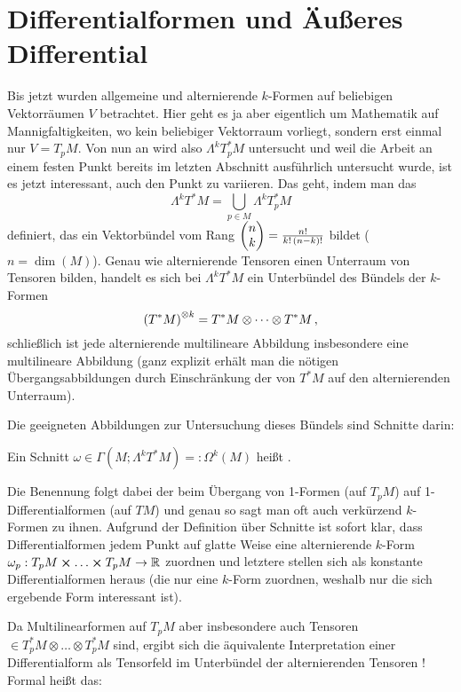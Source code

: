 \documentclass[../H_Analysis_main.tex]{subfiles}
\begin{document}
	\section{Differentialformen und Äußeres Differential}
Bis jetzt wurden allgemeine und alternierende $k$-Formen auf beliebigen Vektorräumen $V$ betrachtet. Hier geht es ja aber eigentlich um Mathematik auf Mannigfaltigkeiten, wo kein beliebiger Vektorraum vorliegt, sondern erst einmal nur $V = T_p M$. Von nun an wird also $\Lambda^k T_p^* M$ untersucht und weil die Arbeit an einem festen Punkt bereits im letzten Abschnitt ausführlich untersucht wurde, ist es jetzt interessant, auch den Punkt zu variieren. Das geht, indem man das 
\begin{equation}
\Lambda^k T^*M = \bigcup_{p \in M} \Lambda^k T_p^* M
\end{equation}
definiert, das ein Vektorbündel vom Rang $\mqty(n \\ k) = \frac{n!}{k! \, (n - k)!}$ bildet ($n = \dim(M)$). Genau wie alternierende Tensoren einen Unterraum von Tensoren bilden, handelt es sich bei $\Lambda^k T^* M$ ein Unterbündel des Bündels der $k$-Formen
\begin{equation*}
\qty(T^* M)^{\otimes k} = T^* M \otimes \dots \otimes T^* M \, ,
\end{equation*}
schließlich ist jede alternierende multilineare Abbildung insbesondere eine multilineare Abbildung (ganz explizit erhält man die nötigen Übergangsabbildungen durch Einschränkung der von $T^* M$ auf den alternierenden Unterraum).

Die geeigneten Abbildungen zur Untersuchung dieses Bündels sind Schnitte darin:
\begin{defi}[Differentialform]
Ein Schnitt $\omega \in \Gamma(M; \Lambda^k T^*M) =: \Omega^k(M)$ heißt .
\end{defi}

Die Benennung folgt dabei der beim Übergang von 1-Formen (auf $T_p M$) auf 1-Differentialformen (auf $TM$) und genau so sagt man oft auch verkürzend $k$-Formen zu ihnen. Aufgrund der Definition über Schnitte ist sofort klar, dass Differentialformen jedem Punkt auf glatte Weise eine alternierende $k$-Form $\omega_p: T_p M \cross \dots \cross T_p M \rightarrow \mathbb{R}$ zuordnen und letztere stellen sich als konstante Differentialformen heraus (die nur eine $k$-Form zuordnen, weshalb nur die sich ergebende Form interessant ist).

Da Multilinearformen auf $T_p M$ aber insbesondere auch Tensoren $\in T_p^* M \otimes \dots \otimes T_p^* M$ sind, ergibt sich die äquivalente Interpretation einer Differentialform als Tensorfeld im Unterbündel der alternierenden Tensoren ! Formal heißt das:
\end{document}
